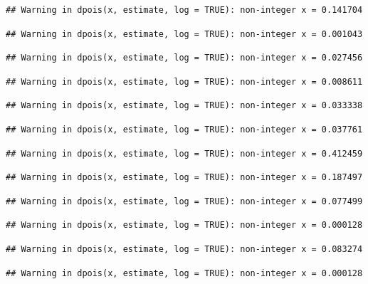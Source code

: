 \documentclass[]{article}
\begin{document}
\begin{verbatim}
## Warning in dpois(x, estimate, log = TRUE): non-integer x = 0.141704
\end{verbatim}

\begin{verbatim}
## Warning in dpois(x, estimate, log = TRUE): non-integer x = 0.001043
\end{verbatim}

\begin{verbatim}
## Warning in dpois(x, estimate, log = TRUE): non-integer x = 0.027456
\end{verbatim}

\begin{verbatim}
## Warning in dpois(x, estimate, log = TRUE): non-integer x = 0.008611
\end{verbatim}

\begin{verbatim}
## Warning in dpois(x, estimate, log = TRUE): non-integer x = 0.033338
\end{verbatim}

\begin{verbatim}
## Warning in dpois(x, estimate, log = TRUE): non-integer x = 0.037761
\end{verbatim}

\begin{verbatim}
## Warning in dpois(x, estimate, log = TRUE): non-integer x = 0.412459
\end{verbatim}

\begin{verbatim}
## Warning in dpois(x, estimate, log = TRUE): non-integer x = 0.187497
\end{verbatim}

\begin{verbatim}
## Warning in dpois(x, estimate, log = TRUE): non-integer x = 0.077499
\end{verbatim}

\begin{verbatim}
## Warning in dpois(x, estimate, log = TRUE): non-integer x = 0.000128
\end{verbatim}

\begin{verbatim}
## Warning in dpois(x, estimate, log = TRUE): non-integer x = 0.083274
\end{verbatim}

\begin{verbatim}
## Warning in dpois(x, estimate, log = TRUE): non-integer x = 0.000128
\end{verbatim}
\end{document}
